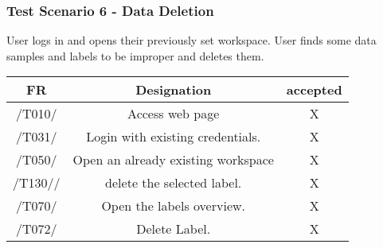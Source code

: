 \subsubsection{Test Scenario 6 - Data Deletion}
User logs in and opens their previously set workspace. User finds some data samples and
labels to be improper and deletes them.
\begin{table}[h]
\begin{tabular}{!{\VRule}c!{\VRule}c!{\VRule}c!{\VRule}}
\hline
FR     & Designation                                                                    &accepted                \\
\hline
  /T010/ &  Access web page &   X  \\
 \hline
 /T031/  &  Login with existing credentials. &   X  \\
 \hline
 /T050/  &  Open an already existing workspace &   X  \\
 \hline
  /T130//  &  delete the selected label. &   X  \\
 \hline
  /T070/   &  Open the labels overview. &   X  \\
 \hline
 /T072/   &  Delete Label. &   X  \\
 \hline
\end{tabular}
\end{table}
\clearpage
